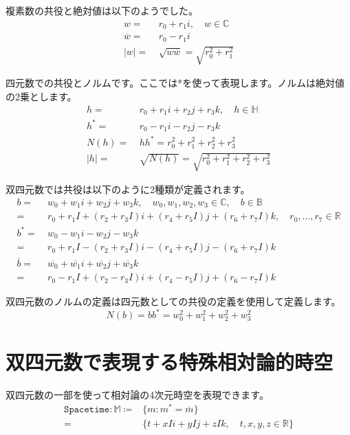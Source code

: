 \documentclass[a4paper,12pt]{jsreport}
\begin{document}
複素数の共役と絶対値は以下のようでした。
\begin{equation}
\begin{split}
w=~&r_0+r_1i,\quad w\in\mathbb{C}\\
\overline{w}=~&r_0-r_1i\\
|w|=~&\sqrt{w\overline{w}}=\sqrt{r_0^2+r_1^2}
\end{split}
\end{equation}

四元数での共役とノルムです。ここでは*を使って表現します。ノルムは絶対値の2乗とします。
\begin{equation}
\begin{split}
h=~&r_0+r_1i+r_2j+r_3k,\quad h\in\mathbb{H}\\
h^*=~&r_0-r_1i-r_2j-r_3k\\
N(h)=~&hh^*=r_0^2+r_1^2+r_2^2+r_3^2\\
|h|=~&\sqrt{N(h)}=\sqrt{r_0^2+r_1^2+r_2^2+r_3^2}
\end{split}
\end{equation}

双四元数では共役は以下のように2種類が定義されます。
\begin{equation}
\begin{split}
b=~&w_0+w_1i+w_2j+w_3k,\quad w_0,w_1,w_2,w_3\in\mathbb{C},\quad b\in\mathbb{B}\\
=~&r_0+r_1I+(r_2+r_3I)i+(r_4+r_5I)j+(r_6+r_7I)k,\quad r_0,...,r_7\in\mathbb{R}\\
b^*=~&w_0-w_1i-w_2j-w_3k\\
=~&r_0+r_1I-(r_2+r_3I)i-(r_4+r_5I)j-(r_6+r_7I)k\\
\overline{b}=~&\overline{w_0}+\overline{w_1}i+\overline{w_2}j+\overline{w_3}k\\
=~&r_0-r_1I+(r_2-r_3I)i+(r_4-r_5I)j+(r_6-r_7I)k
\end{split}
\end{equation}

双四元数のノルムの定義は四元数としての共役の定義を使用して定義します。
\begin{equation}
N(b)=bb^*=w_0^2+w_1^2+w_2^2+w_3^2
\end{equation}

\section{双四元数で表現する特殊相対論的時空}

双四元数の一部を使って相対論の4次元時空を表現できます。
\begin{equation}
\begin{split}
\texttt{Spacetime}:\mathbb{M}\coloneq &\{m:m^*=\overline{m}\}\\
=&\{t+xIi+yIj+zIk,\quad t,x,y,z\in\mathbb{R}\}
\end{split}
\end{equation}
\end{document}
